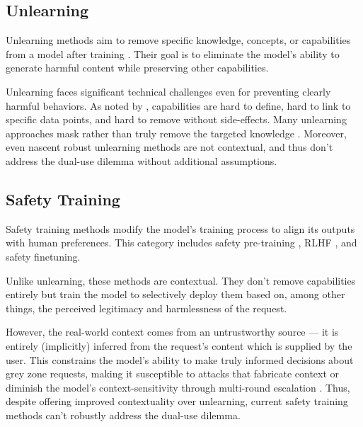 \documentclass{article}
\theoremstyle{plain}
\theoremstyle{definition}
\theoremstyle{remark}
\begin{document}
\subsection{Unlearning}

Unlearning methods aim to remove specific knowledge, concepts, or capabilities from a model after training \cite{liu2024rethinkingmachineunlearninglarge}. Their goal is to eliminate the model's ability to generate harmful content while preserving other capabilities.

Unlearning faces significant technical challenges even for preventing clearly harmful behaviors. As noted by \citet{barez2025openproblemsmachineunlearning}, capabilities are hard to define, hard to link to specific data points, and hard to remove without side-effects. Many unlearning approaches mask rather than truly remove the targeted knowledge \cite{deeb2025unlearningmethodsremoveinformation}. Moreover, even nascent robust unlearning methods \cite{cloud2024gradientroutingmaskinggradients} are not contextual, and thus don't address the dual-use dilemma without additional assumptions.

\subsection{Safety Training}

Safety training methods modify the model's training process to align its outputs with human preferences. This category includes safety pre-training \cite{maini2025safetypretraininggenerationsafe}, RLHF \cite{christiano2023deepreinforcementlearninghuman}, and safety finetuning.

Unlike unlearning, these methods are contextual. They don't remove capabilities entirely but train the model to selectively deploy them based on, among other things, the perceived legitimacy and harmlessness of the request.

However, the real-world context comes from an untrustworthy source --- it is entirely (implicitly) inferred from the request's content which is supplied by the user. This constrains the model's ability to make truly informed decisions about grey zone requests, making it susceptible to attacks that fabricate context \cite{zeng2024johnnypersuadellmsjailbreak} or diminish the model's context-sensitivity through multi-round escalation \cite{russinovich2025greatwritearticlethat}.
Thus, despite offering improved contextuality over unlearning, current safety training methods can't robustly address the dual-use dilemma.
\end{document}
